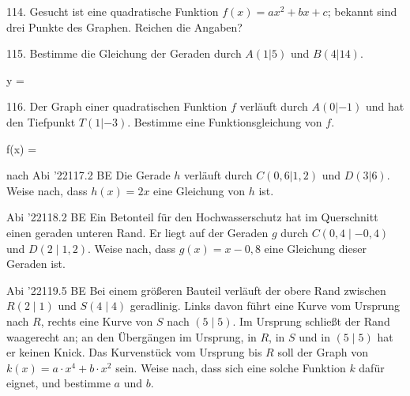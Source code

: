 \documentclass[11pt]{article}
\begin{document}
\begin{pfaufg}{}{114.}{}
Gesucht ist eine quadratische Funktion $f(x) = ax^2 + bx + c$; bekannt sind drei Punkte des Graphen. Reichen die Angaben? 
\end{pfaufg}
\pfgruppe{}
\begin{pfaufg}{}{115.}{}
Bestimme die Gleichung der Geraden durch $A(1|5)$ und $B(4|14)$.
\par\noindent y = \leerfeld \par
{}
\end{pfaufg}
\pfgruppe{}
\begin{pfaufg}{}{116.}{}
Der Graph einer quadratischen Funktion $f$ verläuft durch $A(0|-1)$ und hat den Tiefpunkt $T(1|-3)$. Bestimme eine Funktionsgleichung von $f$.
\par\noindent f(x) = \leerfeld \par
{}
\end{pfaufg}
\pfgruppe{}
\begin{pfaufg}{nach Abi ’22}{117.}{2 BE}
Die Gerade $h$ verläuft durch $C(0{,}6|1{,}2)$ und $D(3|6)$. Weise nach, dass $h(x) = 2x$ eine Gleichung von $h$ ist.
\end{pfaufg}
\pfgruppe{}
\begin{pfaufg}{Abi ’22}{118.}{2 BE}
Ein Betonteil für den Hochwasserschutz hat im Querschnitt einen geraden unteren Rand. Er liegt auf der Geraden $g$ durch $C(0{,}4 \mid -0{,}4)$ und $D(2 \mid 1{,}2)$. Weise nach, dass $g(x) = x - 0{,}8$ eine Gleichung dieser Geraden ist.
\par\smallskip\noindent {}\par
{}
\end{pfaufg}
\pfgruppe{}
\begin{pfaufg}{Abi ’22}{119.}{5 BE}
Bei einem größeren Bauteil verläuft der obere Rand zwischen $R(2 \mid 1)$ und $S(4 \mid 4)$ geradlinig. Links davon führt eine Kurve vom Ursprung nach $R$, rechts eine Kurve von $S$ nach $(5 \mid 5)$. Im Ursprung schließt der Rand waagerecht an; an den Übergängen im Ursprung, in $R$, in $S$ und in $(5 \mid 5)$ hat er keinen Knick. Das Kurvenstück vom Ursprung bis $R$ soll der Graph von $k(x) = a\cdot x^4 + b\cdot x^2$ sein. Weise nach, dass sich eine solche Funktion $k$ dafür eignet, und bestimme $a$ und $b$.
\par\smallskip\noindent {}\par
{}
\end{pfaufg}
\end{document}

